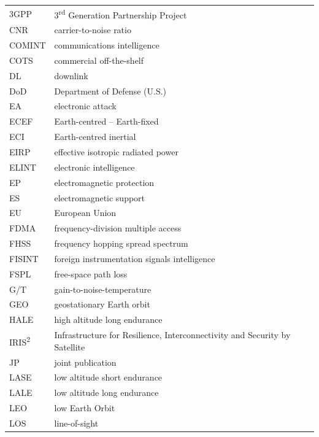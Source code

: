 \documentclass[english, 12pt, a4paper, elec, utf8, a-1b, online]{aaltothesis}
\begin{document}
\begin{tabular}{ll}
3GPP                    & 3\textsuperscript{rd} Generation Partnership Project \\
CNR                     & carrier-to-noise ratio \\
COMINT                  & communications intelligence \\
COTS                    & commercial off-the-shelf \\
DL                      & downlink \\
DoD                     & Department of Defense (U.S.) \\
EA                      & electronic attack \\
ECEF                    & Earth-centred -- Earth-fixed \\
ECI                     & Earth-centred inertial \\
EIRP                    & effective isotropic radiated power \\
ELINT                   & electronic intelligence \\
EP                      & electromagnetic protection \\
ES                      & electromagnetic support \\
EU                      & European Union \\
FDMA                    & frequency-division multiple access \\
FHSS                    & frequency hopping spread spectrum \\
FISINT                  & foreign instrumentation signals intelligence \\
FSPL                    & free-space path loss \\
G/T                     & gain-to-noise-temperature \\
GEO                     & geostationary Earth orbit \\
HALE                    & high altitude long endurance \\
IRIS\textsuperscript{2} & Infrastructure for Resilience, Interconnectivity and Security by Satellite \\
JP                      & joint publication \\
LASE                    & low altitude short endurance \\
LALE                    & low altitude long endurance \\
LEO                     & low Earth Orbit \\
LOS                     & line-of-sight \\

\end{tabular}
\end{document}
